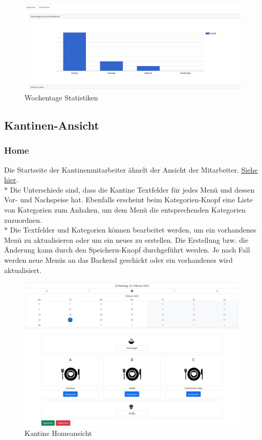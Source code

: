 \begin{figure}[htp]
    \centering
    \includegraphics[scale=0.3]{pics/statistiken_wochentage.JPG}
    \caption{Wochentage Statistiken}
    \label{fig:impl:WeekDaysCategories}
\end{figure}

\pagebreak

\subsection {Kantinen-Ansicht}
\subsubsection {Home}

Die Startseite der Kantinenmitarbeiter ähnelt der Ansicht der Mitarbeiter. \hyperref[sec:MitHome]{Siehe hier}. \\*
Die Unterschiede sind, dass die Kantine Textfelder für jedes Menü und dessen Vor- und Nachspeise hat.
Ebenfalls erscheint beim Kategorien-Knopf eine Liste von Kategorien zum Anhaken, um dem Menü die entsprechenden Kategorien zuzuordnen. \\*
Die Textfelder und Kategorien können bearbeitet werden, um ein vorhandenes Menü zu aktualisieren oder um ein neues zu erstellen.
Die Erstellung bzw. die Änderung kann durch den Speichern-Knopf durchgeführt werden. Je nach Fall werden neue Menüs an das Backend geschickt oder ein
vorhandenes wird aktualisiert.

\begin{figure}[htp]
    \centering
    \includegraphics[scale=0.35]{pics/kantine_home.JPG}
    \caption{Kantine Homeansicht}
    \label{fig:impl:CantineHome}
\end{figure}

